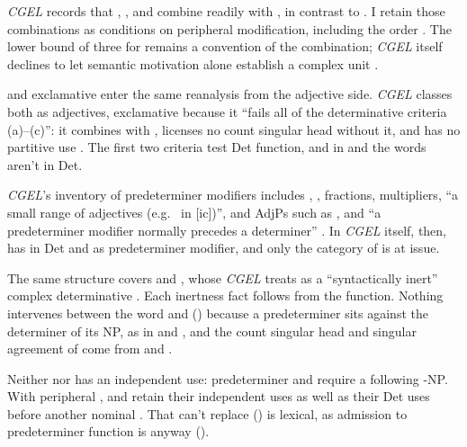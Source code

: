 \documentclass[12pt]{article}
\begin{document}
\textit{CGEL} records that , , and  combine readily with , in contrast to  \citep[392]{huddleston2002}. I retain those combinations as conditions on peripheral modification, including the order . The lower bound of three for  \citep[392]{huddleston2002} remains a convention of the combination; \textit{CGEL} itself declines to let semantic motivation alone establish a complex unit \citep[621]{huddleston2002}.

 and exclamative  enter the same reanalysis from the adjective side. \textit{CGEL} classes both as adjectives, exclamative  because it \enquote{fails all of the determinative criteria (a)--(c)}: it combines with , licenses no count singular head without it, and has no partitive use \citep[539--540]{huddleston2002}. The first two criteria test Det function, and in  and  the words aren't in Det.

\textit{CGEL}'s inventory of predeterminer modifiers includes , , fractions, multipliers, \enquote{a small range of adjectives (e.g.\  in [ic])}, and AdjPs such as , and \enquote{a predeterminer modifier normally precedes a determiner} \citep[331]{huddleston2002}. In \textit{CGEL} itself, then,  has  in Det and  as predeterminer modifier, and only the category of  is at issue.

The same structure covers  and , whose  \textit{CGEL} treats as a \enquote{syntactically inert} complex determinative \citep[394]{huddleston2002}. Each inertness fact follows from the function. Nothing intervenes between the word and  () because a predeterminer sits against the determiner of its NP, as in  and , and the count singular head and singular agreement of  come from  and .

Neither  nor  has an independent use: predeterminer  and  require a following -NP. With peripheral ,  and  retain their independent uses as well as their Det uses before another nominal \citep[392, 394]{huddleston2002}. That  can't replace  () is lexical, as admission to predeterminer function is anyway ().
\end{document}
